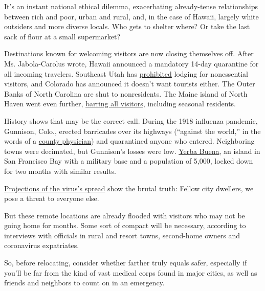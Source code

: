 It's an instant national ethical dilemma, exacerbating already-tense
relationships between rich and poor, urban and rural, and, in the case
of Hawaii, largely white outsiders and more diverse locals. Who gets to
shelter where? Or take the last sack of flour at a small supermarket?

Destinations known for welcoming visitors are now closing themselves
off. After Ms. Jabola-Carolus wrote, Hawaii announced a mandatory 14-day
quarantine for all incoming travelers. Southeast Utah has
\href{https://www.nytimes.com/2020/03/21/travel/coronavirus-tourists-conflict.html}{prohibited}
lodging for nonessential visitors, and Colorado has announced it doesn't
want tourists either. The Outer Banks of North Carolina are shut to
nonresidents. The Maine island of North Haven went even further,
\href{https://www.pressherald.com/2020/03/16/north-haven-votes-to-keep-nonresidents-off-island-out-of-coronavirus-fears/?fbclid=IwAR2NnA5B8jgufxiPK5OHQSofOX0VrNB_GZo7zs9QBO0svs9I4g3ojUt3svw}{barring
all visitors}, including seasonal residents.

History shows that may be the correct call. During the 1918 influenza
pandemic, Gunnison, Colo., erected barricades over its highways
(``against the world,'' in the words of a
\href{http://chm.med.umich.edu/wp-content/uploads/sites/20/2015/02/gnc05.pdf}{county
physician}) and quarantined anyone who entered. Neighboring towns were
decimated, but Gunnison's losses were low.
\href{http://chm.med.umich.edu/research/1918-influenza-escape-communities/yerba-buena/}{Yerba
Buena}, an island in San Francisco Bay with a military base and a
population of 5,000, locked down for two months with similar results.

\href{https://www.nytimes.com/interactive/2020/03/20/us/coronavirus-model-us-outbreak.html?action=click\&module=Spotlight\&pgtype=Homepage}{Projections
of the virus's spread} show the brutal truth: Fellow city dwellers, we
pose a threat to everyone else.

But these remote locations are already flooded with visitors who may not
be going home for months. Some sort of compact will be necessary,
according to interviews with officials in rural and resort towns,
second-home owners and coronavirus expatriates.

So, before relocating, consider whether farther truly equals safer,
especially if you'll be far from the kind of vast medical corps found in
major cities, as well as friends and neighbors to count on in an
emergency.

